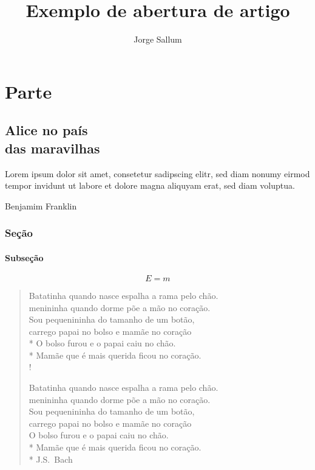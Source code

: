 \documentclass{memoir}
\title{Exemplo de abertura de artigo}
\author{Jorge Sallum}
\begin{document}
 

\maketitle

 
\setcounter{tocdepth}{4} 
\setcounter{secnumdepth}{0} 
\tableofcontents*





\part{Parte}



\chapter[Alice no país...][Cabeço]{Alice no país\\ das maravilhas}

\epigraph{Lorem ipsum dolor sit amet, consetetur sadipscing elitr, sed diam nonumy eirmod tempor invidunt ut labore et dolore magna aliquyam erat, sed diam voluptua.}{Benjamim Franklin}

\section{Seção}
\lipsum[1]

\subsection{Subseção}\label{gancho}

\begin{equation}
E=m
\end{equation}

\thispagestyle{empty}
\begin{verse}
Batatinha quando nasce espalha a rama pelo chão.\\
menininha quando dorme põe a mão no coração.\\
Sou pequenininha do tamanho de um botão,\\
carrego papai no bolso e mamãe no coração\\*
O bolso furou e o papai caiu no chão.\\*
Mamãe que é mais querida ficou no coração.\\!

Batatinha quando nasce espalha a rama pelo chão.\\
menininha quando dorme põe a mão no coração.\\
Sou pequenininha do tamanho de um botão,\\
carrego papai no bolso e mamãe no coração\\
O bolso furou e o papai caiu no chão.\\*
Mamãe que é mais querida ficou no coração.\\*
\nobreak\medskip
\hfill J.S.~Bach


\end{verse}
\lipsum[2]
\end{document}
